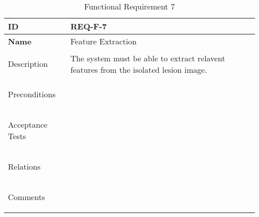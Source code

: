 \begin{table}[H]
    \begin{tabular}[t]{ | >{\bfseries}l | p{9.5cm} |}

    \hline
    ID
    &  REQ-F-7 \\ \hline

    Name
    & Feature Extraction \\ \hline

    Description
    & The system must be able to extract relavent features from the isolated lesion image. \\ \hline

    Preconditions
    &  \\ \hline

    Acceptance Tests
    & \\ \hline

    Relations
    &  \\ \hline

    Comments
    &  \\ \hline

    \end{tabular}

    \caption{Functional Requirement 7}
    \label{fig:req_f_7}

\end{table}